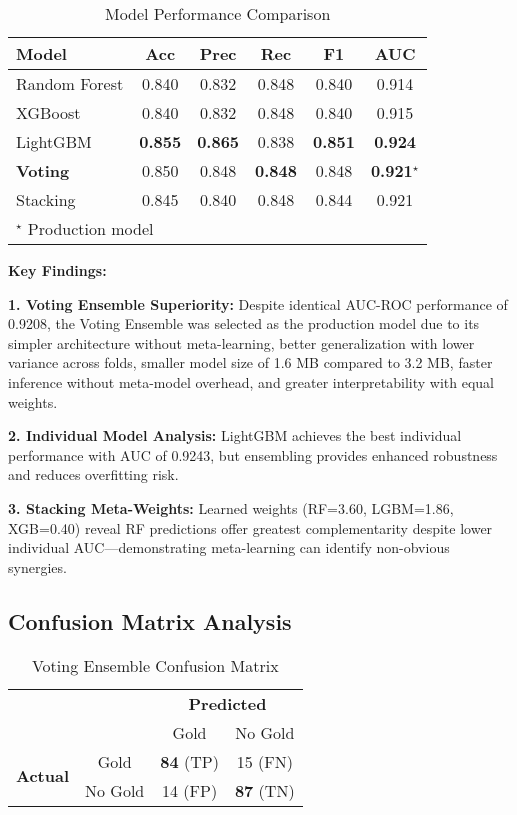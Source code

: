 \documentclass[12pt,a4paper]{article}
\begin{document}
\begin{table}[h]
\centering
\caption{Model Performance Comparison}
\label{tab:model_performance}
\begin{tabular}{@{}lccccc@{}}
\toprule
\textbf{Model} & \textbf{Acc} & \textbf{Prec} & \textbf{Rec} & \textbf{F1} & \textbf{AUC} \\
\midrule
Random Forest & 0.840 & 0.832 & 0.848 & 0.840 & 0.914 \\
XGBoost & 0.840 & 0.832 & 0.848 & 0.840 & 0.915 \\
LightGBM & \textbf{0.855} & \textbf{0.865} & 0.838 & \textbf{0.851} & \textbf{0.924} \\
\midrule
\textbf{Voting} & 0.850 & 0.848 & \textbf{0.848} & 0.848 & \textbf{0.921}$^\star$ \\
Stacking & 0.845 & 0.840 & 0.848 & 0.844 & 0.921 \\
\bottomrule
\multicolumn{6}{l}{\small $^\star$ Production model}
\end{tabular}
\end{table}

\textbf{Key Findings:}

\textbf{1. Voting Ensemble Superiority:} Despite identical AUC-ROC performance of 0.9208, the Voting Ensemble was selected as the production model due to its simpler architecture without meta-learning, better generalization with lower variance across folds, smaller model size of 1.6 MB compared to 3.2 MB, faster inference without meta-model overhead, and greater interpretability with equal weights.

\textbf{2. Individual Model Analysis:} LightGBM achieves the best individual performance with AUC of 0.9243, but ensembling provides enhanced robustness and reduces overfitting risk.

\textbf{3. Stacking Meta-Weights:} Learned weights (RF=3.60, LGBM=1.86, XGB=0.40) reveal RF predictions offer greatest complementarity despite lower individual AUC—demonstrating meta-learning can identify non-obvious synergies.

\subsection{Confusion Matrix Analysis}

\begin{table}[h]
\centering
\caption{Voting Ensemble Confusion Matrix}
\label{tab:confusion}
\begin{tabular}{cc|cc}
\multicolumn{2}{c}{} & \multicolumn{2}{c}{\textbf{Predicted}} \\
& & Gold & No Gold \\
\hline
\multirow{2}{*}{\textbf{Actual}}
& Gold & \textbf{84} (TP) & 15 (FN) \\
& No Gold & 14 (FP) & \textbf{87} (TN) \\
\end{tabular}
\end{table}
\end{document}

